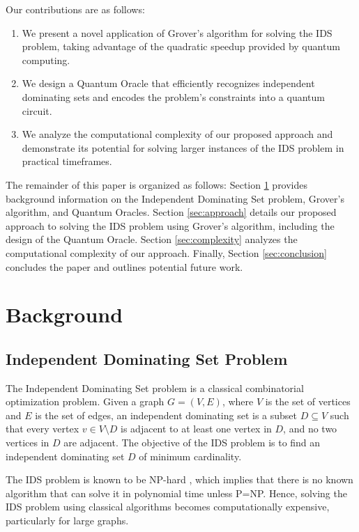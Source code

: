Our contributions are as follows:

\begin{enumerate}
    \item We present a novel application of Grover's algorithm for solving the IDS problem, taking advantage of the quadratic speedup provided by quantum computing.
    \item We design a Quantum Oracle that efficiently recognizes independent dominating sets and encodes the problem's constraints into a quantum circuit.
    \item We analyze the computational complexity of our proposed approach and demonstrate its potential for solving larger instances of the IDS problem in practical timeframes.
\end{enumerate}

The remainder of this paper is organized as follows: Section \ref{sec:background} provides background information on the Independent Dominating Set problem, Grover's algorithm, and Quantum Oracles. Section \ref{sec:approach} details our proposed approach to solving the IDS problem using Grover's algorithm, including the design of the Quantum Oracle. Section \ref{sec:complexity} analyzes the computational complexity of our approach. Finally, Section \ref{sec:conclusion} concludes the paper and outlines potential future work.

\section{Background}
\label{sec:background}

\subsection{Independent Dominating Set Problem}

The Independent Dominating Set problem is a classical combinatorial optimization problem. Given a graph $G = (V, E)$, where $V$ is the set of vertices and $E$ is the set of edges, an independent dominating set is a subset $D \subseteq V$ such that every vertex $v \in V \setminus D$ is adjacent to at least one vertex in $D$, and no two vertices in $D$ are adjacent. The objective of the IDS problem is to find an independent dominating set $D$ of minimum cardinality.

The IDS problem is known to be NP-hard \cite{Garey1979}, which implies that there is no known algorithm that can solve it in polynomial time unless P=NP. Hence, solving the IDS problem using classical algorithms becomes computationally expensive, particularly for large graphs.

